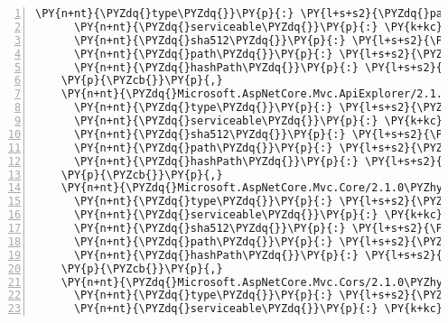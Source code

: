\begin{Verbatim}[commandchars=\\\{\},numbers=left,firstnumber=1,stepnumber=1,numberblanklines=0]
      \PY{n+nt}{\PYZdq{}type\PYZdq{}}\PY{p}{:} \PY{l+s+s2}{\PYZdq{}package\PYZdq{}}\PY{p}{,}
      \PY{n+nt}{\PYZdq{}serviceable\PYZdq{}}\PY{p}{:} \PY{k+kc}{true}\PY{p}{,}
      \PY{n+nt}{\PYZdq{}sha512\PYZdq{}}\PY{p}{:} \PY{l+s+s2}{\PYZdq{}sha512\PYZhy{}8Ez0ktMeFMBDI6e6YmpMeU20N59skr0Ah1o6jzrSZCvK734Ax3A69CElogioL5OcfsvehRstPodajr2m1bYXJg==\PYZdq{}}\PY{p}{,}
      \PY{n+nt}{\PYZdq{}path\PYZdq{}}\PY{p}{:} \PY{l+s+s2}{\PYZdq{}microsoft.aspnetcore.mvc.analyzers/2.1.0\PYZhy{}rc1\PYZhy{}final\PYZdq{}}\PY{p}{,}
      \PY{n+nt}{\PYZdq{}hashPath\PYZdq{}}\PY{p}{:} \PY{l+s+s2}{\PYZdq{}microsoft.aspnetcore.mvc.analyzers.2.1.0\PYZhy{}rc1\PYZhy{}final.nupkg.sha512\PYZdq{}}
    \PY{p}{\PYZcb{}}\PY{p}{,}
    \PY{n+nt}{\PYZdq{}Microsoft.AspNetCore.Mvc.ApiExplorer/2.1.0\PYZhy{}rc1\PYZhy{}final\PYZdq{}}\PY{p}{:} \PY{p}{\PYZob{}}
      \PY{n+nt}{\PYZdq{}type\PYZdq{}}\PY{p}{:} \PY{l+s+s2}{\PYZdq{}package\PYZdq{}}\PY{p}{,}
      \PY{n+nt}{\PYZdq{}serviceable\PYZdq{}}\PY{p}{:} \PY{k+kc}{true}\PY{p}{,}
      \PY{n+nt}{\PYZdq{}sha512\PYZdq{}}\PY{p}{:} \PY{l+s+s2}{\PYZdq{}sha512\PYZhy{}AA8GO+e0bbGseiHE2OwN8zIwy84AkobfVxjdC3Tjo+0Bh7XFjApYpknLBcxk2eQG5FG3SnHYHbmqgUy8PnK1Jw==\PYZdq{}}\PY{p}{,}
      \PY{n+nt}{\PYZdq{}path\PYZdq{}}\PY{p}{:} \PY{l+s+s2}{\PYZdq{}microsoft.aspnetcore.mvc.apiexplorer/2.1.0\PYZhy{}rc1\PYZhy{}final\PYZdq{}}\PY{p}{,}
      \PY{n+nt}{\PYZdq{}hashPath\PYZdq{}}\PY{p}{:} \PY{l+s+s2}{\PYZdq{}microsoft.aspnetcore.mvc.apiexplorer.2.1.0\PYZhy{}rc1\PYZhy{}final.nupkg.sha512\PYZdq{}}
    \PY{p}{\PYZcb{}}\PY{p}{,}
    \PY{n+nt}{\PYZdq{}Microsoft.AspNetCore.Mvc.Core/2.1.0\PYZhy{}rc1\PYZhy{}final\PYZdq{}}\PY{p}{:} \PY{p}{\PYZob{}}
      \PY{n+nt}{\PYZdq{}type\PYZdq{}}\PY{p}{:} \PY{l+s+s2}{\PYZdq{}package\PYZdq{}}\PY{p}{,}
      \PY{n+nt}{\PYZdq{}serviceable\PYZdq{}}\PY{p}{:} \PY{k+kc}{true}\PY{p}{,}
      \PY{n+nt}{\PYZdq{}sha512\PYZdq{}}\PY{p}{:} \PY{l+s+s2}{\PYZdq{}sha512\PYZhy{}oqZDmyI6c5GDuVsVy7L7pwG84ejYA3ae2Rql9EB7TU0q4ms1xJ61cRbVK78ycOnq5rH8SHNG4RZGKKD7dSfQXg==\PYZdq{}}\PY{p}{,}
      \PY{n+nt}{\PYZdq{}path\PYZdq{}}\PY{p}{:} \PY{l+s+s2}{\PYZdq{}microsoft.aspnetcore.mvc.core/2.1.0\PYZhy{}rc1\PYZhy{}final\PYZdq{}}\PY{p}{,}
      \PY{n+nt}{\PYZdq{}hashPath\PYZdq{}}\PY{p}{:} \PY{l+s+s2}{\PYZdq{}microsoft.aspnetcore.mvc.core.2.1.0\PYZhy{}rc1\PYZhy{}final.nupkg.sha512\PYZdq{}}
    \PY{p}{\PYZcb{}}\PY{p}{,}
    \PY{n+nt}{\PYZdq{}Microsoft.AspNetCore.Mvc.Cors/2.1.0\PYZhy{}rc1\PYZhy{}final\PYZdq{}}\PY{p}{:} \PY{p}{\PYZob{}}
      \PY{n+nt}{\PYZdq{}type\PYZdq{}}\PY{p}{:} \PY{l+s+s2}{\PYZdq{}package\PYZdq{}}\PY{p}{,}
      \PY{n+nt}{\PYZdq{}serviceable\PYZdq{}}\PY{p}{:} \PY{k+kc}{true}\PY{p}{,}

\end{Verbatim}
